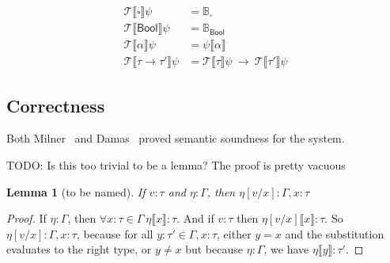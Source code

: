 \begin{align*}
  \mathcal{T}\llbracket \square \rrbracket\psi &= \mathbb{B}_{ \square } \\
  \mathcal{T}\llbracket \mathsf{Bool} \rrbracket \psi &= \mathbb{B}_{\mathsf{Bool}} \\
  \mathcal{T}\llbracket \alpha \rrbracket \psi &= \psi \llbracket \alpha \rrbracket \\
  \mathcal{T} \llbracket \tau \rightarrow \tau' \rrbracket \psi &= \mathcal{T}\llbracket \tau \rrbracket \psi \ \rightarrow \
                             \mathcal{T} \llbracket \tau' \rrbracket \psi
\end{align*}

\subsection{Correctness}

Both Milner~\cite{milner1978} and Damas~\cite{damas1982} proved semantic
soundness for the system.

TODO: Is this too trivial to be a lemma? The proof is pretty vacuous
\newtheorem{lemma}{Lemma}
\begin{lemma}[to be named]\label{lem:1}
  If $v : \tau$ and $\eta : \Gamma$, then $\eta[v/x] : \Gamma,x : \tau$
\end{lemma}
\begin{proof}
  If $\eta : \Gamma$, then $\forall x : \tau \in \Gamma \ \eta\llbracket x \rrbracket : \tau$.
  And if $v : \tau$ then $\eta[v/x] \llbracket x \rrbracket : \tau$.
  So $\eta[v/x] : \Gamma,x : \tau$, because for all $y : \tau' \in \Gamma,x : \tau$, either $y =
  x$ and the substitution evaluates to the right type, or $y \neq x$ but
  because $\eta : \Gamma$, we have $\eta \llbracket y \rrbracket : \tau'$.
\end{proof}

